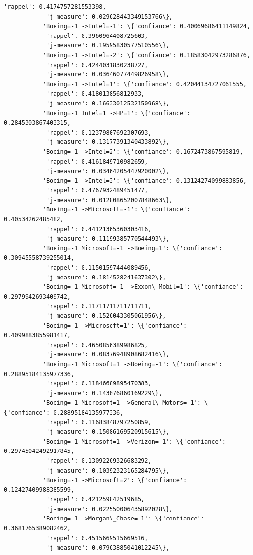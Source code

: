 \documentclass[11pt]{article}
\begin{document}
\begin{Verbatim}[commandchars=\\\{\}]
            'rappel': 0.4174757281553398,
            'j-measure': 0.029628443349153766\},
           'Boeing=-1 ->Intel=-1': \{'confiance': 0.40069686411149824,
            'rappel': 0.3960964408725603,
            'j-measure': 0.19595830577510556\},
           'Boeing=-1 ->Intel=-2': \{'confiance': 0.18583042973286876,
            'rappel': 0.4244031830238727,
            'j-measure': 0.03646077449826958\},
           'Boeing=-1 ->Intel=1': \{'confiance': 0.42044134727061555,
            'rappel': 0.418013856812933,
            'j-measure': 0.16633012532150968\},
           'Boeing=-1 Intel=1 ->HP=1': \{'confiance': 0.2845303867403315,
            'rappel': 0.12379807692307693,
            'j-measure': 0.13177391340433892\},
           'Boeing=-1 ->Intel=2': \{'confiance': 0.1672473867595819,
            'rappel': 0.4161849710982659,
            'j-measure': 0.03464205447920002\},
           'Boeing=-1 ->Intel=3': \{'confiance': 0.13124274099883856,
            'rappel': 0.4767932489451477,
            'j-measure': 0.012808652007848663\},
           'Boeing=-1 ->Microsoft=-1': \{'confiance': 0.40534262485482,
            'rappel': 0.44121365360303416,
            'j-measure': 0.11199385770544493\},
           'Boeing=-1 Microsoft=-1 ->Boeing=1': \{'confiance': 0.30945558739255014,
            'rappel': 0.11501597444089456,
            'j-measure': 0.1814528241637302\},
           'Boeing=-1 Microsoft=-1 ->Exxon\_Mobil=1': \{'confiance': 0.2979942693409742,
            'rappel': 0.11711711711711711,
            'j-measure': 0.1526043305061956\},
           'Boeing=-1 ->Microsoft=1': \{'confiance': 0.4099883855981417,
            'rappel': 0.4650856389986825,
            'j-measure': 0.08376948908682416\},
           'Boeing=-1 Microsoft=1 ->Boeing=-1': \{'confiance': 0.28895184135977336,
            'rappel': 0.11846689895470383,
            'j-measure': 0.143076860169229\},
           'Boeing=-1 Microsoft=1 ->General\_Motors=-1': \{'confiance': 0.28895184135977336,
            'rappel': 0.11683848797250859,
            'j-measure': 0.15086169520915615\},
           'Boeing=-1 Microsoft=1 ->Verizon=-1': \{'confiance': 0.29745042492917845,
            'rappel': 0.13092269326683292,
            'j-measure': 0.10392323165284795\},
           'Boeing=-1 ->Microsoft=2': \{'confiance': 0.12427409988385599,
            'rappel': 0.421259842519685,
            'j-measure': 0.022550006435892028\},
           'Boeing=-1 ->Morgan\_Chase=-1': \{'confiance': 0.3681765389082462,
            'rappel': 0.4515669515669516,
            'j-measure': 0.07963885041012245\},

\end{Verbatim}
\end{document}
